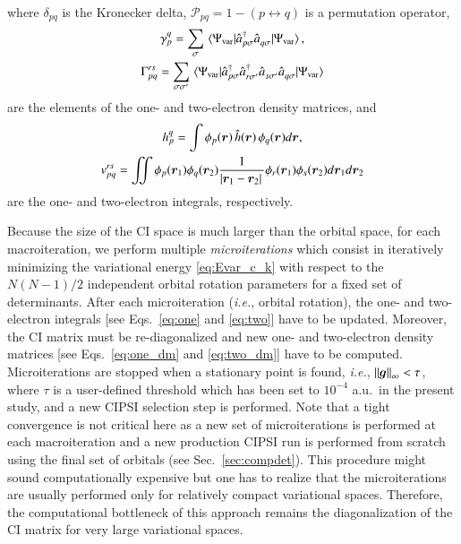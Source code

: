 \documentclass[aip,jcp,reprint,noshowkeys,superscriptaddress,floatfix]{revtex4-1}
\newcommand{\ie}{\textit{i.e.}}
\newcommand{\Norb}{N}
\newcommand{\hh}{\Hat{h}}
\newcommand{\cre}[1]{\Hat{a}_{#1}^{\dagger}}
\newcommand{\ani}[1]{\Hat{a}_{#1}^{}}
\newcommand{\bg}{\boldsymbol{g}}
\newcommand{\br}{\boldsymbol{r}}
\newcommand{\cP}{\mathcal{P}}
\newcommand{\Psivar}{\Psi_\text{var}}
\newcommand{\MO}[1]{\phi_{#1}}
\begin{document}
where $\delta_{pq}$ is the Kronecker delta, $\cP_{pq} = 1 - (p \leftrightarrow q)$ is a permutation operator,
\begin{subequations}
\begin{gather}
	\label{eq:one_dm}
	\gamma_p^q = \sum_{\sigma} \mel{\Psivar}{\hat{a}_{p \sigma}^{\dagger} \hat{a}_{q \sigma}^{}}{\Psivar},
	\\
	\label{eq:two_dm}
	\Gamma_{pq}^{rs} = \sum_{\sigma \sigma'} \mel{\Psivar}{\cre{p\sigma} \cre{r\sigma'} \ani{s\sigma'} \ani{q\sigma}}{\Psivar}
\end{gather}
\end{subequations}
are the elements of the one- and two-electron density matrices, and
\begin{subequations}
\begin{gather}
	\label{eq:one}
	h_p^q = \int \MO{p}(\br) \, \hh(\br) \, \MO{q}(\br) d\br,
	\\
	\label{eq:two}
	v_{pq}^{rs} = \iint  \MO{p}(\br_1) \MO{q}(\br_2) \frac{1}{\abs*{\br_1 - \br_2}} \MO{r}(\br_1) \MO{s}(\br_2) d\br_1 d\br_2
\end{gather}
\end{subequations}
are the one- and two-electron integrals, respectively.

Because the size of the CI space is much larger than the orbital space, for each macroiteration, we perform multiple \textit{microiterations} which consist in iteratively minimizing the variational energy \eqref{eq:Evar_c_k} with respect to the $\Norb(\Norb-1)/2$ independent orbital rotation parameters for a fixed set of determinants.
After each microiteration (\ie, orbital rotation), the one- and two-electron integrals [see Eqs.~\eqref{eq:one} and \eqref{eq:two}] have to be updated. 
Moreover, the CI matrix must be re-diagonalized and new one- and two-electron density matrices [see Eqs.~\eqref{eq:one_dm} and \eqref{eq:two_dm}] have to be computed.
Microiterations are stopped when a stationary point is found, \ie, $\norm{\bg}_\infty < \tau$, where $\tau$ is a user-defined threshold which has been set to $10^{-4}$ a.u.~in the present study, and a new CIPSI selection step is performed.
Note that a tight convergence is not critical here as a new set of microiterations is performed at each macroiteration and a new production CIPSI run is performed from scratch using the final set of orbitals (see Sec.~\ref{sec:compdet}).
This procedure might sound computationally expensive but one has to realize that the microiterations are usually performed only for relatively compact variational spaces.
Therefore, the computational bottleneck of this approach remains the diagonalization of the CI matrix for very large variational spaces.
\end{document}
